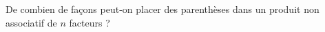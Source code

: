 De combien de façons peut-on placer des parenthèses dans un produit non associatif de $n$ facteurs ?
